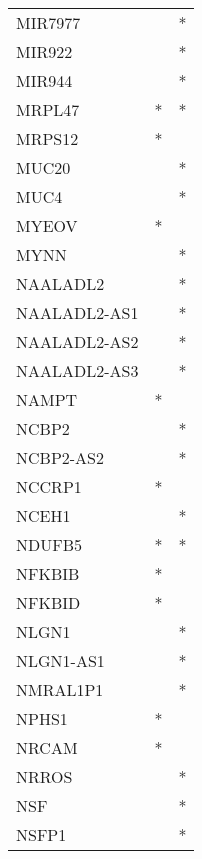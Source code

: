 \begin{longtable}{lcc}
MIR7977          &                &          * \\
MIR922           &                &          * \\
MIR944           &                &          * \\
MRPL47           &              * &          * \\
MRPS12           &              * &            \\
MUC20            &                &          * \\
MUC4             &                &          * \\
MYEOV            &              * &            \\
MYNN             &                &          * \\
NAALADL2         &                &          * \\
NAALADL2-AS1     &                &          * \\
NAALADL2-AS2     &                &          * \\
NAALADL2-AS3     &                &          * \\
NAMPT            &              * &            \\
NCBP2            &                &          * \\
NCBP2-AS2        &                &          * \\
NCCRP1           &              * &            \\
NCEH1            &                &          * \\
NDUFB5           &              * &          * \\
NFKBIB           &              * &            \\
NFKBID           &              * &            \\
NLGN1            &                &          * \\
NLGN1-AS1        &                &          * \\
NMRAL1P1         &                &          * \\
NPHS1            &              * &            \\
NRCAM            &              * &            \\
NRROS            &                &          * \\
NSF              &                &          * \\
NSFP1            &                &          * \\

\end{longtable}
